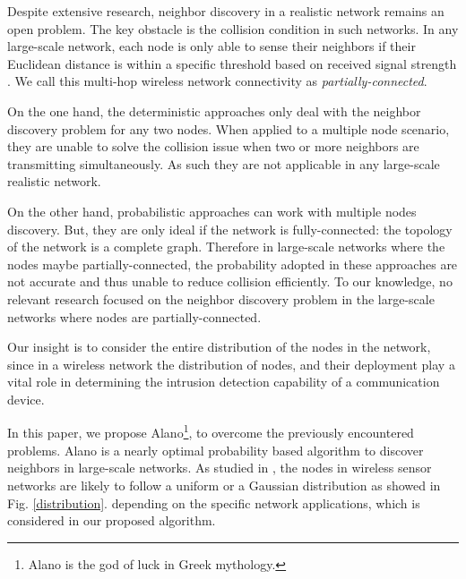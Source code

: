 Despite extensive research, neighbor discovery in a realistic network remains an open problem.
The key obstacle is the collision condition in such networks.
In any large-scale network, each node is only able to sense their neighbors
if their Euclidean distance is within a specific threshold 
based on received signal strength \cite{moscibroda2006complexity, wang2013gaussian, wang2015connectivity}.  
We call this multi-hop wireless network connectivity as \emph{partially-connected}.


On the one hand, the deterministic approaches only deal with the neighbor discovery problem for any two nodes.
When applied to a multiple node scenario, they are unable to solve the collision issue when two or more neighbors are transmitting simultaneously. As such they are not applicable in any large-scale realistic network.


On the other hand, probabilistic approaches can work with multiple nodes discovery. But, they are only ideal if
the network is fully-connected: the topology of the network is a complete graph. 
Therefore in large-scale networks where the nodes maybe partially-connected,  
the probability adopted in these approaches are not accurate and thus unable to reduce collision efficiently. 
To our knowledge, no relevant research focused on the neighbor discovery problem in the large-scale networks 
where nodes are partially-connected.


Our insight is to consider the entire distribution of the nodes in the network,
since in a wireless network the distribution of 
nodes, and their deployment play a vital role in determining the intrusion 
detection capability of a communication device.

In this paper, we propose Alano\footnote{Alano is the god of luck in Greek mythology.}, to overcome the previously encountered problems. 
Alano is a nearly optimal probability based algorithm to discover neighbors in large-scale networks. 
As studied in \cite{wang2013gaussian} , the nodes in wireless sensor networks are likely to 
follow a uniform or a Gaussian distribution as showed in Fig. \ref{distribution}.
depending on the specific network applications, which is considered in our proposed algorithm.

